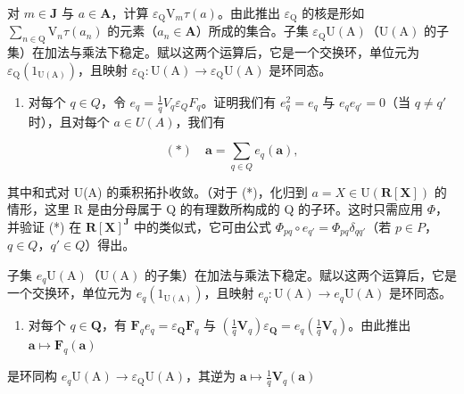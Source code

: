 对 \(m \in \mathbf{J}\) 与 \(a \in \mathbf{A}\)，计算 \(\varepsilon_{\mathrm{Q}} \mathrm{V}_{m} \tau(a)\)。由此推出 \(\varepsilon_{\mathrm{Q}}\) 的核是形如 \(\sum_{n \in \mathrm{Q}} \mathrm{V}_{n} \tau(a_{n})\) 的元素（\(a_{n} \in \mathbf{A}\)）所成的集合。子集 \(\varepsilon_{\mathrm{Q}} \mathrm{U}(\mathrm{A})\)（\(\mathrm{U}(\mathrm{A})\) 的子集）在加法与乘法下稳定。赋以这两个运算后，它是一个交换环，单位元为 \(\varepsilon_{\mathrm{Q}}(1_{\mathrm{U}(\mathrm{A})})\)，且映射 \(\varepsilon_{\mathrm{Q}}: \mathrm{U}(\mathrm{A}) \to \varepsilon_{\mathrm{Q}} \mathrm{U}(\mathrm{A})\) 是环同态。

\begin{enumerate}
\def\labelenumi{\alph{enumi})}
\setcounter{enumi}{3}
\tightlist
\item
  对每个 \(q \in Q\)，令 \(e_{q} = \frac{1}{q} V_{q} \varepsilon_{Q} F_{q}\)。证明我们有 \(e_{q}^{2} = e_{q}\) 与 \(e_{q} e_{q'} = 0\)（当 \(q \neq q'\) 时），且对每个 \(a \in U(A)\)，我们有
\end{enumerate}

\[
(*) \quad \boldsymbol {a} = \sum_ {q \in Q} e _ {q} (\boldsymbol {a}),
\]

其中和式对 U(A) 的乘积拓扑收敛。（对于 (*)，化归到 \(a = X \in \mathrm{U}(\mathbf{R}[\mathbf{X}])\) 的情形，这里 R 是由分母属于 Q 的有理数所构成的 Q 的子环。这时只需应用 \(\Phi\)，并验证 (*) 在 \(\mathbf{R}[\mathbf{X}]^{\mathbf{J}}\) 中的类似式，它可由公式 \(\Phi_{pq} \circ e_{q'} = \Phi_{pq} \delta_{qq'}\)（若 \(p \in P\)，\(q \in Q\)，\(q' \in Q\)）得出。

子集 \(e_q \mathrm{U(A)}\)（\(\mathrm{U(A)}\) 的子集）在加法与乘法下稳定。赋以这两个运算后，它是一个交换环，单位元为 \(e_q(1_{\mathrm{U(A)}})\)，且映射 \(e_q: \mathrm{U(A)} \to e_q \mathrm{U(A)}\) 是环同态。

\begin{enumerate}
\def\labelenumi{\alph{enumi})}
\setcounter{enumi}{4}
\tightlist
\item
  对每个 \(q \in \mathbf{Q}\)，有 \(\mathbf{F}_q e_q = \varepsilon_{\mathbf{Q}} \mathbf{F}_q\) 与 \(\left(\frac{1}{q} \mathbf{V}_q\right) \varepsilon_{\mathbf{Q}} = e_q \left(\frac{1}{q} \mathbf{V}_q\right)\)。由此推出 \(\boldsymbol{a} \mapsto \mathbf{F}_q(\boldsymbol{a})\)
\end{enumerate}

是环同构 \(e_q\mathrm{U(A)}\to \varepsilon_{\mathrm{Q}}\mathrm{U(A)}\)，其逆为 \(\pmb {a}\mapsto \frac{1}{q}\mathbf{V}_q(\pmb {a})\)

